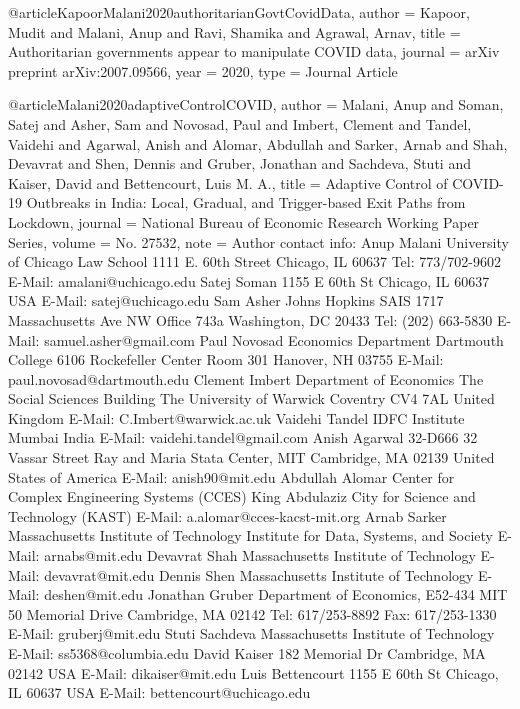 {{{{%

@article{KapoorMalani2020authoritarianGovtCovidData,
   author = {Kapoor, Mudit and Malani, Anup and Ravi, Shamika and Agrawal, Arnav},
   title = {Authoritarian governments appear to manipulate COVID data},
   journal = {arXiv preprint arXiv:2007.09566},
   year = {2020},
   type = {Journal Article}
}

@article{Malani2020adaptiveControlCOVID,
   author = {Malani, Anup and Soman, Satej and Asher, Sam and Novosad, Paul and Imbert, Clement and Tandel, Vaidehi and Agarwal, Anish and Alomar, Abdullah and Sarker, Arnab and Shah, Devavrat and Shen, Dennis and Gruber, Jonathan and Sachdeva, Stuti and Kaiser, David and Bettencourt, Luis M. A.},
   title = {Adaptive Control of COVID-19 Outbreaks in India: Local, Gradual, and Trigger-based Exit Paths from Lockdown},
   journal = {National Bureau of Economic Research Working Paper Series},
   volume = {No. 27532},
   note = {Author contact info: Anup Malani University of Chicago Law School 1111 E. 60th Street Chicago, IL 60637 Tel: 773/702-9602 E-Mail: amalani@uchicago.edu Satej Soman 1155 E 60th St Chicago, IL 60637 USA E-Mail: satej@uchicago.edu Sam Asher Johns Hopkins SAIS 1717 Massachusetts Ave NW Office 743a Washington, DC 20433 Tel: (202) 663-5830 E-Mail: samuel.asher@gmail.com Paul Novosad Economics Department Dartmouth College 6106 Rockefeller Center Room 301 Hanover, NH 03755 E-Mail: paul.novosad@dartmouth.edu Clement Imbert Department of Economics The Social Sciences Building The University of Warwick Coventry CV4 7AL United Kingdom E-Mail: C.Imbert@warwick.ac.uk Vaidehi Tandel IDFC Institute Mumbai India E-Mail: vaidehi.tandel@gmail.com Anish Agarwal 32-D666 32 Vassar Street Ray and Maria Stata Center, MIT Cambridge, MA 02139 United States of America E-Mail: anish90@mit.edu Abdullah Alomar Center for Complex Engineering Systems (CCES) King Abdulaziz City for Science and Technology (KAST) E-Mail: a.alomar@cces-kacst-mit.org Arnab Sarker Massachusetts Institute of Technology Institute for Data, Systems, and Society E-Mail: arnabs@mit.edu Devavrat Shah Massachusetts Institute of Technology E-Mail: devavrat@mit.edu Dennis Shen Massachusetts Institute of Technology E-Mail: deshen@mit.edu Jonathan Gruber Department of Economics, E52-434 MIT 50 Memorial Drive Cambridge, MA 02142 Tel: 617/253-8892 Fax: 617/253-1330 E-Mail: gruberj@mit.edu Stuti Sachdeva Massachusetts Institute of Technology E-Mail: ss5368@columbia.edu David Kaiser 182 Memorial Dr Cambridge, MA 02142 USA E-Mail: dikaiser@mit.edu Luis Bettencourt 1155 E 60th St Chicago, IL 60637 USA E-Mail: bettencourt@uchicago.edu
}}}}}}
